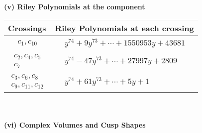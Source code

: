 \documentclass[1p]{elsarticle_modified}
\theoremstyle{definition}
\begin{document}
\newpage\renewcommand{\arraystretch}{1}
\flushleft \textbf{(v) Riley Polynomials at the component}\newline \\
\begin{tabular}{m{50pt}|m{274pt}}
Crossings & \hspace{64pt}Riley Polynomials at each crossing \\
\hline $$\begin{aligned}c_{1},c_{10}\end{aligned}$$&$\begin{aligned}
&y^{74}+9 y^{73}+\cdots+1550953 y+43681
\end{aligned}$\\
\hline $$\begin{aligned}c_{2},c_{4},c_{5}\\c_{7}\end{aligned}$$&$\begin{aligned}
&y^{74}-47 y^{73}+\cdots+27997 y+2809
\end{aligned}$\\
\hline $$\begin{aligned}c_{3},c_{6},c_{8}\\c_{9},c_{11},c_{12}\end{aligned}$$&$\begin{aligned}
&y^{74}+61 y^{73}+\cdots+5 y+1
\end{aligned}$\\
\hline
\end{tabular}\\~\\
\newpage\flushleft \textbf{(vi) Complex Volumes and Cusp Shapes}
\end{document}
